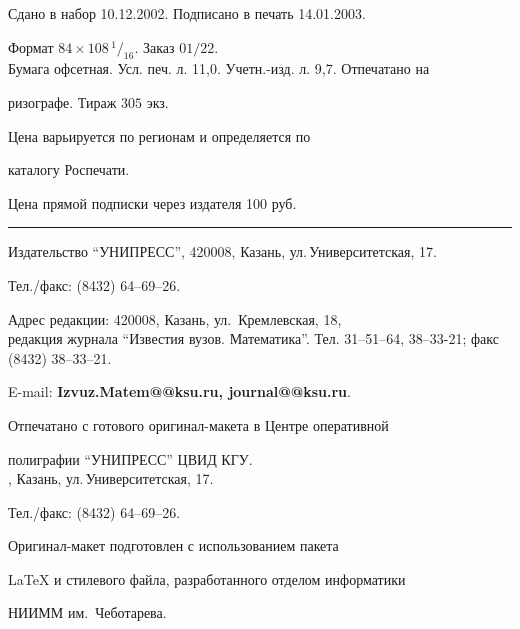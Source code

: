 \noindent Сдано в набор 10.12.2002. Подписано в печать 14.01.2003.


Формат $84\times 108 \,^1/_{16}.$ Заказ $01/22$.\\


Бумага офсетная. Усл. печ. л. 11,0. Учетн.-изд. л. 9,7. Отпечатано на 


ризографе. Тираж $305$ экз. 





\noindent Цена варьируется по регионам и определяется по 


каталогу Роспечати. 





\noindent Цена прямой подписки через издателя 100 руб. 


\bigskip


\hrule


\bigskip


\noindent Издательство ``УНИПРЕСС'', 420008, Казань, ул.\,Университетская, 17.


Тел./факс: (8432) 64--69--26.\\


\smallskip





\noindent Адрес редакции: 420008, Казань, ул.~Кремлевская, 18,\\  


редакция журнала  ``Известия вузов. Математика''. Тел. 31--51--64, 38--33-21; факс (8432) 38--33--21.





\noindent E-mail: {\bf Izvuz.Matem@@ksu.ru, journal@@ksu.ru}. \par


\bigskip 


\noindent Отпечатано с готового оригинал-макета в Центре оперативной


полиграфии ``УНИПРЕСС'' ЦВИД КГУ. \\





, Казань, ул.\,Университетская, 17.


Тел./факс: (8432) 64--69--26. \par


\bigskip


\noindent Оригинал-макет подготовлен с использованием пакета


\AmS\LaTeX{} и стилевого файла, разработанного отделом информатики


НИИММ им.~Чеботарева.








